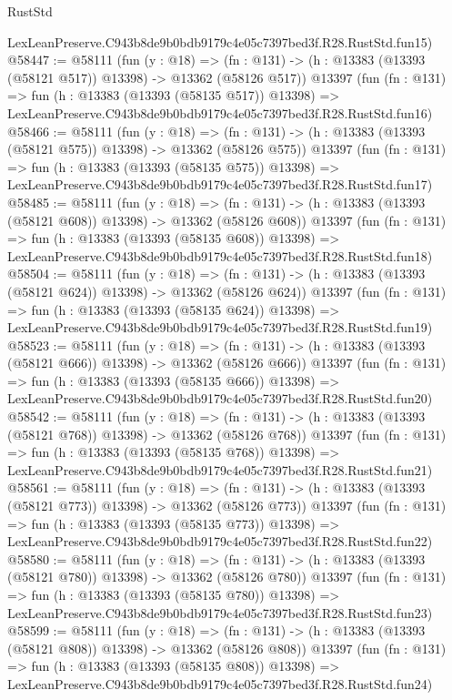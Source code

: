 \begin{lexlean}{RustStd}
\begin{coremodule}
    LexLeanPreserve.C943b8de9b0bdb9179c4e05c7397bed3f.R28.RustStd.fun15)
@58447 := @58111
    (fun (y : @18) =>
    (fn : @131) -> (h : @13383 (@13393 (@58121 @517)) @13398) -> @13362 (@58126 @517))
    @13397
    (fun (fn : @131) =>
    fun (h : @13383 (@13393 (@58135 @517)) @13398) =>
    LexLeanPreserve.C943b8de9b0bdb9179c4e05c7397bed3f.R28.RustStd.fun16)
@58466 := @58111
    (fun (y : @18) =>
    (fn : @131) -> (h : @13383 (@13393 (@58121 @575)) @13398) -> @13362 (@58126 @575))
    @13397
    (fun (fn : @131) =>
    fun (h : @13383 (@13393 (@58135 @575)) @13398) =>
    LexLeanPreserve.C943b8de9b0bdb9179c4e05c7397bed3f.R28.RustStd.fun17)
@58485 := @58111
    (fun (y : @18) =>
    (fn : @131) -> (h : @13383 (@13393 (@58121 @608)) @13398) -> @13362 (@58126 @608))
    @13397
    (fun (fn : @131) =>
    fun (h : @13383 (@13393 (@58135 @608)) @13398) =>
    LexLeanPreserve.C943b8de9b0bdb9179c4e05c7397bed3f.R28.RustStd.fun18)
@58504 := @58111
    (fun (y : @18) =>
    (fn : @131) -> (h : @13383 (@13393 (@58121 @624)) @13398) -> @13362 (@58126 @624))
    @13397
    (fun (fn : @131) =>
    fun (h : @13383 (@13393 (@58135 @624)) @13398) =>
    LexLeanPreserve.C943b8de9b0bdb9179c4e05c7397bed3f.R28.RustStd.fun19)
@58523 := @58111
    (fun (y : @18) =>
    (fn : @131) -> (h : @13383 (@13393 (@58121 @666)) @13398) -> @13362 (@58126 @666))
    @13397
    (fun (fn : @131) =>
    fun (h : @13383 (@13393 (@58135 @666)) @13398) =>
    LexLeanPreserve.C943b8de9b0bdb9179c4e05c7397bed3f.R28.RustStd.fun20)
@58542 := @58111
    (fun (y : @18) =>
    (fn : @131) -> (h : @13383 (@13393 (@58121 @768)) @13398) -> @13362 (@58126 @768))
    @13397
    (fun (fn : @131) =>
    fun (h : @13383 (@13393 (@58135 @768)) @13398) =>
    LexLeanPreserve.C943b8de9b0bdb9179c4e05c7397bed3f.R28.RustStd.fun21)
@58561 := @58111
    (fun (y : @18) =>
    (fn : @131) -> (h : @13383 (@13393 (@58121 @773)) @13398) -> @13362 (@58126 @773))
    @13397
    (fun (fn : @131) =>
    fun (h : @13383 (@13393 (@58135 @773)) @13398) =>
    LexLeanPreserve.C943b8de9b0bdb9179c4e05c7397bed3f.R28.RustStd.fun22)
@58580 := @58111
    (fun (y : @18) =>
    (fn : @131) -> (h : @13383 (@13393 (@58121 @780)) @13398) -> @13362 (@58126 @780))
    @13397
    (fun (fn : @131) =>
    fun (h : @13383 (@13393 (@58135 @780)) @13398) =>
    LexLeanPreserve.C943b8de9b0bdb9179c4e05c7397bed3f.R28.RustStd.fun23)
@58599 := @58111
    (fun (y : @18) =>
    (fn : @131) -> (h : @13383 (@13393 (@58121 @808)) @13398) -> @13362 (@58126 @808))
    @13397
    (fun (fn : @131) =>
    fun (h : @13383 (@13393 (@58135 @808)) @13398) =>
    LexLeanPreserve.C943b8de9b0bdb9179c4e05c7397bed3f.R28.RustStd.fun24)

\end{coremodule}
\end{lexlean}
